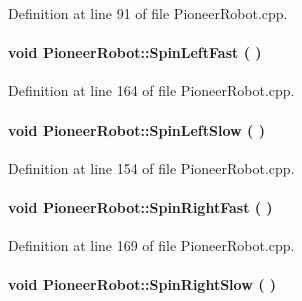 \begin{appendices}
\-Definition at line 91 of file \-Pioneer\-Robot.\-cpp.

\paragraph[{\-Spin\-Left\-Fast}]{\setlength{\rightskip}{0pt plus 5cm}void {\bf \-Pioneer\-Robot\-::\-Spin\-Left\-Fast} (
)}\label{class_pioneer_robot_a4d151faa33be37f7ce1da5d59c907dc1}


\-Definition at line 164 of file \-Pioneer\-Robot.\-cpp.

\paragraph[{\-Spin\-Left\-Slow}]{\setlength{\rightskip}{0pt plus 5cm}void {\bf \-Pioneer\-Robot\-::\-Spin\-Left\-Slow} (
)}\label{class_pioneer_robot_a604a97dddb6910bb7ea086fd521c01fd}


\-Definition at line 154 of file \-Pioneer\-Robot.\-cpp.

\paragraph[{\-Spin\-Right\-Fast}]{\setlength{\rightskip}{0pt plus 5cm}void {\bf \-Pioneer\-Robot\-::\-Spin\-Right\-Fast} (
)}\label{class_pioneer_robot_afe663e18d34e3dc9bf3988df958f691d}


\-Definition at line 169 of file \-Pioneer\-Robot.\-cpp.

\paragraph[{\-Spin\-Right\-Slow}]{\setlength{\rightskip}{0pt plus 5cm}void {\bf \-Pioneer\-Robot\-::\-Spin\-Right\-Slow} (
)}\label{class_pioneer_robot_a976e2d9dcc5396b52ea323cce8d4f45a}



\end{appendices}
